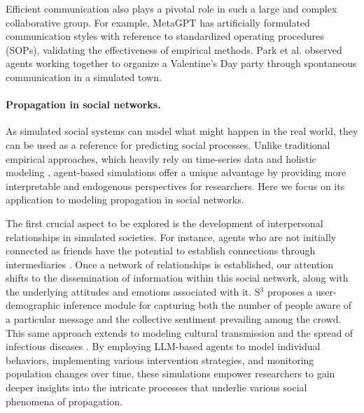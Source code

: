Efficient communication also plays a pivotal role in such a large and complex collaborative group.
For example, MetaGPT \cite{DBLP:journals/corr/abs-2308-00352} has artificially formulated communication styles with reference to standardized operating procedures (SOPs), validating the effectiveness of empirical methods.
Park et al. \cite{DBLP:journals/corr/abs-2304-03442} observed agents working together to organize a Valentine's Day party through spontaneous communication in a simulated town.

\paragraph{Propagation in social networks.}
As simulated social systems can model what might happen in the real world, they can be used as a reference for predicting social processes.
Unlike traditional empirical approaches, which heavily rely on time-series data and holistic modeling \cite{hamilton1989new, DBLP:journals/ijon/Zhang03}, agent-based simulations offer a unique advantage by providing more interpretable and endogenous perspectives for researchers.
Here we focus on its application to modeling propagation in social networks. 

The first crucial aspect to be explored is the development of interpersonal relationships in simulated societies.
For instance, agents who are not initially connected as friends have the potential to establish connections through intermediaries \cite{DBLP:journals/corr/abs-2304-03442}.
Once a network of relationships is established, our attention shifts to the dissemination of information within this social network, along with the underlying attitudes and emotions associated with it.
S$^3$ \cite{DBLP:journals/corr/abs-2307-14984} proposes a user-demographic inference module for capturing both the number of people aware of a particular message and the collective sentiment prevailing among the crowd.
This same approach extends to modeling cultural transmission \cite{kirby2007innateness} and the spread of infectious diseases \cite{DBLP:journals/corr/abs-2307-04986}. 
By employing LLM-based agents to model individual behaviors, implementing various intervention strategies, and monitoring population changes over time, these simulations empower researchers to gain deeper insights into the intricate processes that underlie various social phenomena of propagation.

